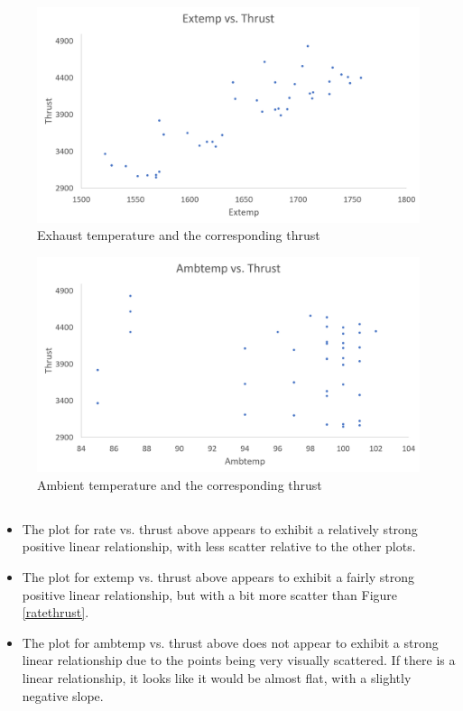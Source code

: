 \documentclass[letterpaper]{article}
\begin{document}
\begin{figure}[H]
 \centering
 \includegraphics[width=\textwidth]{extempthrust.png}
 \caption{Exhaust temperature and the corresponding thrust}
 \label{extempthrust}
\end{figure}

\begin{figure}[H]
 \centering
 \includegraphics[width=\textwidth]{ambtempthrust.png}
 \caption{Ambient temperature and the corresponding thrust}
\end{figure}

\subsection{}
\label{1b}

\begin{itemize}
 \item The plot for rate vs. thrust above appears to exhibit a relatively strong positive
       linear relationship, with less scatter relative to the other plots.
 \item The plot for extemp vs. thrust above appears to exhibit a fairly strong positive
       linear relationship, but with a bit more scatter than Figure \ref{ratethrust}.
 \item The plot for ambtemp vs. thrust above does not appear to exhibit a strong linear
       relationship due to the points being very visually scattered.
       If there is a linear relationship, it looks like it would be almost flat,
       with a slightly negative slope.
\end{itemize}
\end{document}
